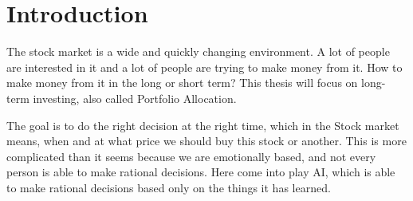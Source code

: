 \chapter{Introduction}\label{ch:introduction}


The stock market is a wide and quickly changing environment.
A lot of people are interested in it and a lot of people are trying to make money from it.
How to make money from it in the long or short term?
This thesis will focus on long-term investing, also called Portfolio Allocation.

The goal is to do the right decision at the right time, which in the Stock market means, when and at what price we should buy this stock or another.
This is more complicated than it seems because we are emotionally
based, and not every person is able to make rational decisions.
Here come into play AI, which is able to make rational
decisions based only on the things it has learned.





